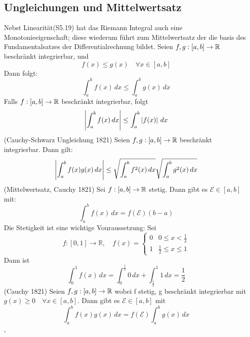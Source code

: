 \subsection{Ungleichungen und Mittelwertsatz}
Nebst Linearität(S5.19) hat das Riemann Integral auch eine Monotonieeigenschaft; diese wiederum führt zum Mittelwertsatz der die basis des Fundamentalsatzes der Differentialrechnung bildet.
\Satz[5.20] Seien \(f,g : [a,b] \rightarrow \mathbb{R} \) beschränkt integrierbar, und
\[ f(x) \leq g(x) \quad \forall x \in [a,b]\]
Dann folgt:
\[ \int_{a}^{b} f(x) \,dx \leq \int_{a}^{b} g(x) \,dx \]
\Korollar[5.21] Falls \(f: [a,b] \rightarrow \mathbb{R} \) beschränkt integrierbar, folgt
\[ \left\lvert  \int_{a}^{b} f(x) \,dx \right\rvert \leq \int_{a}^{b} \left\lvert f(x) \right\rvert \,dx \]
\Satz[5.22](Cauchy-Schwarz Ungleichung 1821)
Seien \(f,g : [a,b] \rightarrow \mathbb{R} \) beschränkt integrierbar. Dann gilt:
\[ \left\lvert \int_{a}^{b} f(x) g(x) \,dx \right\rvert \leq \sqrt{\int_{a}^{b} f^2(x) \,dx} \sqrt{\int_{a}^{b} g^2(x) \,dx }\]
\Satz[5.23](Mittelwertsatz, Cauchy 1821) \newline
Sei \(f: [a,b] \rightarrow \mathbb{R} \) stetig. Dann gibt es \(\mathcal{E} \in [a,b]\) mit:
\[ \int_{a}^{b} f(x) \,dx = f(\mathcal{E})(b-a)\]
\Bsp[5.24] Die Stetigkeit ist eine wichtige Vouraussetzung:
Sei
\begin{equation}
f:[0,1] \longrightarrow \mathbb{R}, \quad f(x)= \begin{cases}0 & 0 \leq x<\frac{1}{2} \\ 1 & \frac{1}{2} \leq x \leq 1\end{cases}
\end{equation}
Dann ist
\[ \int_0^1 f(x) \,dx = \int_0^{\frac{1}{2}} 0 \,dx + \int_{\frac{1}{2}}^1 1 \,dx = \frac{1}{2}\]
\Satz[5.25](Cauchy 1821) Seien \(f,g : [a,b] \rightarrow \mathbb{R} \) wobei f stetig, g beschränkt integrierbar mit \(g(x) \geq 0 \quad \forall x \in [a,b]\). Dann gibt es \(\mathcal{E} \in [a,b] \) mit
\[ \int_{a}^{b} f(x)g(x) \,dx = f(\mathcal{E}) \int_{a}^{b} g(x) \,dx \]
\sep
